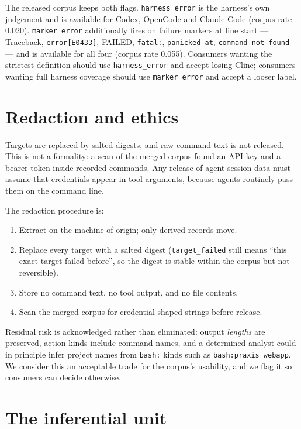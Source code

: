 \documentclass[11pt]{article}
\begin{document}
The released corpus keeps both flags. \texttt{harness\_error} is the
harness's own judgement and is available for Codex, OpenCode and Claude
Code (corpus rate 0.020). \texttt{marker\_error} additionally fires on
failure markers at line start --- Traceback, \texttt{error[E0433]},
FAILED, \texttt{fatal:}, \texttt{panicked at}, \texttt{command not found}
--- and is available for all four (corpus rate 0.055). Consumers wanting
the strictest definition should use \texttt{harness\_error} and accept
losing Cline; consumers wanting full harness coverage should use
\texttt{marker\_error} and accept a looser label.

\section{Redaction and ethics}

Targets are replaced by salted digests, and raw command text is not
released. This is not a formality: a scan of the merged corpus found an
API key and a bearer token inside recorded commands. Any release of
agent-session data must assume that credentials appear in tool arguments,
because agents routinely pass them on the command line.

The redaction procedure is:

\begin{enumerate}
\item Extract on the machine of origin; only derived records move.
\item Replace every target with a salted digest
  (\texttt{target\_failed} still means ``this exact target failed
  before'', so the digest is stable within the corpus but not reversible).
\item Store no command text, no tool output, and no file contents.
\item Scan the merged corpus for credential-shaped strings before release.
\end{enumerate}

Residual risk is acknowledged rather than eliminated: output
\emph{lengths} are preserved, action kinds include command names, and a
determined analyst could in principle infer project names from
\texttt{bash:} kinds such as \texttt{bash:praxis\_webapp}. We consider
this an acceptable trade for the corpus's usability, and we flag it so
consumers can decide otherwise.

\section{The inferential unit}
\label{sec:unit}
\end{document}
